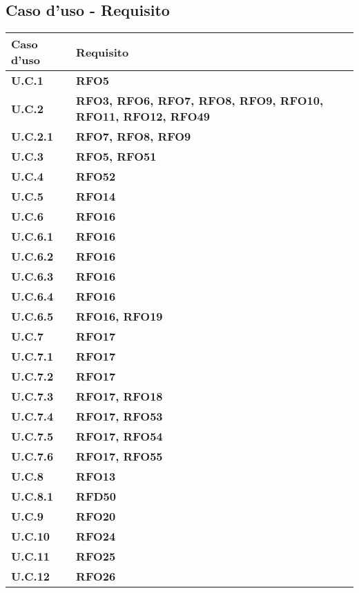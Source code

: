 \subsection{Caso d'uso - Requisito}
\begin{longtable}{|>{\centering\arraybackslash}m{}|>{\centering\arraybackslash}m{}|}
	\hline
	\textbf{Caso d'uso} & \textbf{Requisito}\\
	\endfirsthead
	\hline
	\textbf{U.C.1} & \textbf{RFO5} \\\hline
	\textbf{U.C.2} & \textbf{RFO3, RFO6, RFO7, RFO8, RFO9, RFO10, RFO11, RFO12, RFO49} \\\hline
	\textbf{U.C.2.1} & \textbf{RFO7, RFO8, RFO9} \\\hline
	\textbf{U.C.3} & \textbf{RFO5, RFO51} \\\hline
	\textbf{U.C.4} & \textbf{RFO52} \\\hline
	\textbf{U.C.5} & \textbf{RFO14} \\\hline
	\textbf{U.C.6} & \textbf{RFO16} \\\hline
	\textbf{U.C.6.1} & \textbf{RFO16} \\\hline
	\textbf{U.C.6.2} & \textbf{RFO16} \\\hline
	\textbf{U.C.6.3} & \textbf{RFO16} \\\hline
	\textbf{U.C.6.4} & \textbf{RFO16} \\\hline
	\textbf{U.C.6.5} & \textbf{RFO16, RFO19} \\\hline
	\textbf{U.C.7} & \textbf{RFO17} \\\hline
	\textbf{U.C.7.1} & \textbf{RFO17} \\\hline
	\textbf{U.C.7.2} & \textbf{RFO17} \\\hline
	\textbf{U.C.7.3} & \textbf{RFO17, RFO18} \\\hline
	\textbf{U.C.7.4} & \textbf{RFO17, RFO53} \\\hline
	\textbf{U.C.7.5} & \textbf{RFO17, RFO54} \\\hline
	\textbf{U.C.7.6} & \textbf{RFO17, RFO55} \\\hline
	\textbf{U.C.8} & \textbf{RFO13} \\\hline
	\textbf{U.C.8.1} & \textbf{RFD50} \\\hline
	\textbf{U.C.9} & \textbf{RFO20} \\\hline
	\textbf{U.C.10} & \textbf{RFO24} \\\hline
	\textbf{U.C.11} & \textbf{RFO25} \\\hline
	\textbf{U.C.12} & \textbf{RFO26} \\\hline

\end{longtable}
